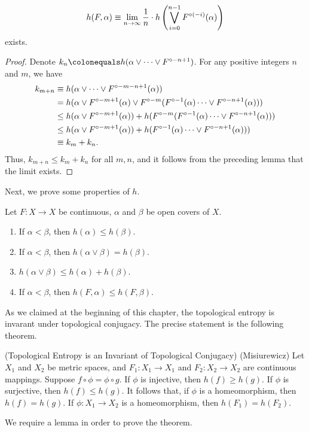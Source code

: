 \documentclass[12pt,twoside,draft]{book}
\begin{document}
\begin{proposition}
   \begin{equation*}
    h(F,\alpha) \equiv \lim\limits_{n \to \infty} \frac{1}{n} \cdot h\left (  \bigvee\limits_{i=0}^{n-1} F^{\circ (-i)}(\alpha)  \right )
  \end{equation*}
  exists.
  \begin{proof}
    Denote $k_n \ceq h(\alpha \vee \cdots \vee \itr{F}{-n+1})$.
    For any positive integers $n$ and $m$, we have
    \begin{align*}
      k_{m+n} &\equiv h(\alpha \vee \cdots \vee F^{\circ -m-n+1}(\alpha))   \\
      &= h(\alpha \vee F^{\circ -m+1}(\alpha) \vee F^{\circ -m}(F^{\circ -1}(\alpha) \cdots \vee F^{\circ -n+1}(\alpha)))   \\
      &\leq  h(\alpha \vee F^{\circ -m+1}(\alpha)) + h(F^{\circ -m}(F^{\circ -1}(\alpha) \cdots \vee F^{\circ -n+1}(\alpha)))   \\
      &\leq  h(\alpha \vee F^{\circ -m+1}(\alpha)) + h(F^{\circ -1}(\alpha) \cdots \vee F^{\circ -n+1}(\alpha)))   \\
      &\equiv k_m + k_n.
    \end{align*}
    Thus, $k_{m+n} \leq k_m + k_n$ for all $m,n$, and it follows from the preceding lemma that the limit exists.
  \end{proof}
\end{proposition}
Next, we prove some properties of $h$.
\begin{proposition}
  Let $F: X \to X$ be continuous, $\alpha$ and $\beta$ be open covers of $X$.
  \begin{enumerate}
    \item If $\alpha < \beta$, then $h(\alpha) \leq h(\beta)$.
    \item If $\alpha < \beta$, then $h(\alpha \vee \beta) = h(\beta)$.
    \item $h(\alpha \vee \beta) \leq h(\alpha) + h(\beta)$.
    \item If $\alpha < \beta$, then $h(F, \alpha) \leq h(F, \beta)$.
  \end{enumerate}
\end{proposition}

As we claimed at the beginning of this chapter, the topological entropy is invarant under topological conjugacy.
The precise statement is the following theorem.
\begin{theorem}
  (Topological Entropy is an Invariant of Topological Conjugacy)
  (Misiurewicz)
  Let $X_1$ and $X_2$ be metric spaces, and $F_1: X_1 \to X_1$ and $F_2: X_2 \to X_2$ are continuous mappings.
  Suppose $f\circ \phi = \phi \circ g$.
  If $\phi$ is injective, then $h(f) \geq h(g)$.
  If $\phi$ is surjective, then $h(f) \leq h(g)$.
  It follows that, if $\phi$ is a homeomorphism, then $h(f) = h(g)$.
  If $\phi: X_1 \to X_2$ is a homeomorphism, then $h(F_1) = h(F_2)$.
  \label{thm:t-ent-conj}
\end{theorem}
We require a lemma in order to prove the theorem.
\end{document}
